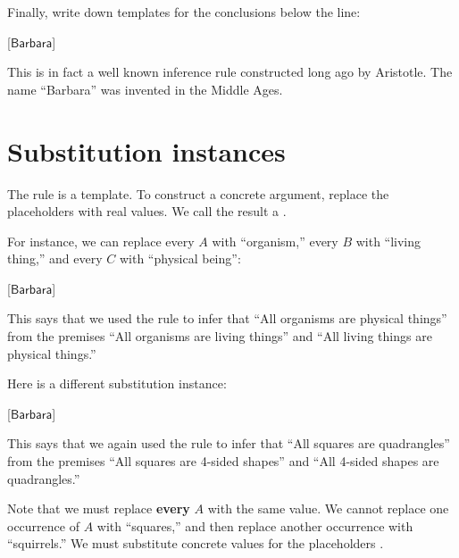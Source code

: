 \documentclass[../../../main.tex]{subfiles}
\begin{document}
\noindent
Finally, write down templates for the conclusions below the line:

\begin{prooftree*}
  [$\mathsf{Barbara}$]{}
\end{prooftree*}

\noindent
This is in fact a well known inference rule constructed long ago by Aristotle. The name ``Barbara'' was invented in the Middle Ages.


\section{Substitution instances}

The  rule is a template. To construct a concrete argument, replace the placeholders with real values. We call the result a .

For instance, we can replace every $A$ with ``organism,'' every $B$ with ``living thing,'' and every $C$ with ``physical being'':

\begin{prooftree*}
  [$\mathsf{Barbara}$]{}
\end{prooftree*}

\noindent
This says that we used the  rule to infer that ``All organisms are physical things'' from the premises ``All organisms are living things'' and ``All living things are physical things.'' 

Here is a different substitution instance:

\begin{prooftree*}
  [$\mathsf{Barbara}$]{}
\end{prooftree*} 

\noindent
This says that we again used the  rule to infer that ``All squares are quadrangles'' from the premises ``All squares are 4-sided shapes'' and ``All 4-sided shapes are quadrangles.'' 

Note that we must replace \textbf{every} $A$ with the same value. We cannot replace one occurrence of $A$ with ``squares,'' and then replace another occurrence with ``squirrels.'' We must substitute concrete values for the placeholders .
\end{document}
